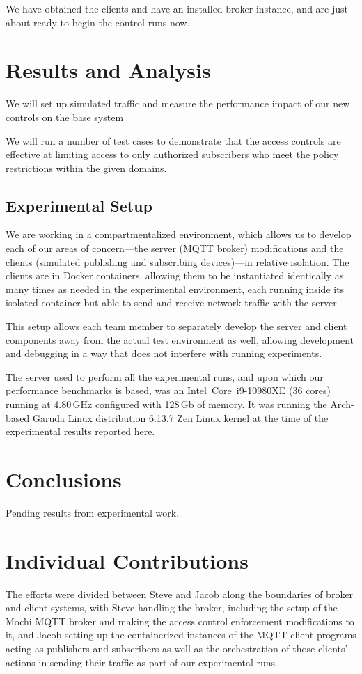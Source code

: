 \documentclass[sigconf, nonacm]{acmart}
\begin{document}
We have obtained the clients and have an installed broker instance, and are just about ready to begin the
control runs now.

\section{Results and Analysis}
We will set up simulated traffic and measure the performance impact of our new
controls on the base system

We will run a number of test cases to demonstrate that the access controls are effective
at limiting access to only authorized subscribers who meet the policy restrictions within
the given domains.

\subsection{Experimental Setup}
We are working in a compartmentalized environment, which allows us to develop each of our areas of concern---the server (MQTT broker) modifications and the clients (simulated publishing and subscribing devices)---in relative isolation. The clients
are in Docker containers, allowing them to be instantiated identically as many times as needed in the experimental environment, each running inside its isolated container but able to send and receive network traffic with the server.

This setup allows each team member to separately develop the server and client components away from the actual test environment as well, allowing development and debugging in a way that does not interfere with running experiments.

The server used to perform all the experimental runs, and upon which our performance benchmarks is based, was an Intel\textregistered\ Core\texttrademark\ i9-10980XE (36 cores) running at 4.80\,GHz configured with 128\,Gb of memory.
It was running the Arch-based Garuda Linux distribution 6.13.7 Zen Linux kernel at the time of the experimental results reported here.
\section{Conclusions}
Pending results from experimental work.
\section{Individual Contributions}
The efforts were divided between Steve and Jacob along the boundaries of broker and client systems,
with Steve handling the broker, including the setup of the Mochi MQTT broker and making the access
control enforcement modifications to it, and Jacob setting up the containerized instances of
the MQTT client programs acting as publishers and subscribers as well as the orchestration of
those clients' actions in sending their traffic as part of our experimental runs.

%

\end{document}
